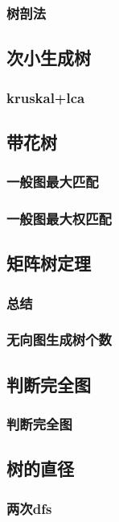 \documentclass[10pt,a4paper]{article}
\begin{document}
\subsubsection{树剖法}

\subsection{次小生成树}
\subsubsection{kruskal+lca}

\subsection{带花树}
\subsubsection{一般图最大匹配}

\subsubsection{一般图最大权匹配}

\subsection{矩阵树定理}
\subsubsection{总结}

\subsubsection{无向图生成树个数}

\subsection{判断完全图}
\subsubsection{判断完全图}

\subsection{树的直径}
\subsubsection{两次dfs}

\end{document}
